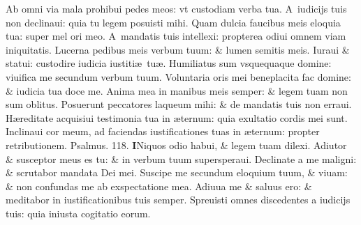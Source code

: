 \documentclass[a5paper,10pt]{book}
\def\ae{æ}
\begin{document}
\begin{multicols*}{2}
\newline \color{red} A\color{black}b omni via mala prohibui pedes meos: vt custodiam verba tua.
\newline \color{red} A\color{black}\ iudicijs tuis non declinaui: quia tu legem posuisti mihi.
\newline \color{red} Q\color{black}uam dulcia faucibus meis eloquia tua: super mel ori meo.
\newline \color{red} A\color{black}\ mandatis tuis intellexi: propterea odiui omnem viam iniquitatis.
\newline \color{red} L\color{black}ucerna pedibus meis verbum tuum: \& lumen semitis meis.
\newline \color{red} I\color{black}uraui \& statui: custodire iudicia iustiti\ae \ tu\ae .
\newline \color{red} H\color{black}umiliatus sum vsquequaque domine: viuifica me secundum verbum tuum.
\newline \color{red} V\color{black}oluntaria oris mei beneplacita fac domine: \& iudicia tua doce me.
\newline \color{red} A\color{black}nima mea in manibus meis semper: \& legem tuam non sum oblitus.
\newline \color{red} P\color{black}osuerunt peccatores laqueum mihi: \& de mandatis tuis non erraui.
\newline \color{red} H\color{black}\ae reditate acquisiui testimonia tua in \ae ternum: quia exultatio cordis mei sunt.
\newline \color{red} I\color{black}nclinaui cor meum, ad faciendas iustificationes tuas in \ae ternum: propter retributionem. \quad \color{red} Psalmus. \hypertarget{ps118.8}{118.} \color{black}
\vspace{-.5em}
\lettrine[lines=2]{\bfseries \color{red} I}{}Niquos odio habui, \& legem tuam dilexi.
\newline \color{red} A\color{black}diutor \& susceptor meus es tu: \& in verbum tuum supersperaui.
\newline \color{red} D\color{black}eclinate a me maligni: \& scrutabor mandata Dei mei.
\newline \color{red} S\color{black}uscipe me secundum eloquium  tuum, \& viuam: \& non confundas me ab exspectatione mea.
\newline \color{red} A\color{black}diuua me \& saluus ero: \& meditabor in iustificationibus tuis semper.
\newline \color{red} S\color{black}preuisti omnes discedentes a iudicijs tuis: quia iniusta cogitatio eorum.

\end{multicols*}
\end{document}
